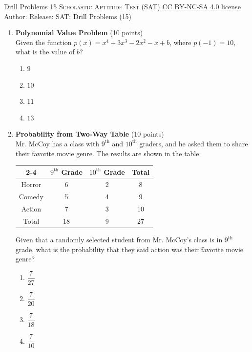 \newpage\handout
{Drill Problems 15}
{\textsc{Scholastic Aptitude Test (SAT)}}
{\href{https://creativecommons.org/licenses/by-nc-sa/4.0/}{CC BY-NC-SA 4.0 license}}
{Author: \BookAuthor}{Release: \generatedOn}
{SAT: Drill Problems (15)}



\begin{enumerate}
  \item \textbf{Polynomial Value Problem} (10 points)\\
  Given the function $p(x)=x^4+3 x^3-2 x^2-x+b$, where $p(-1)=10$, what is the value of $b$?
  \begin{enumerate}[label=(\Alph*)]
    \item $9$
    \item $10$
    \item $11$
    \item $13$
  \end{enumerate}
  \begin{subanswer}
  \end{subanswer}

  \item \textbf{Probability from Two-Way Table} (10 points)\\
  Mr. McCoy has a class with $9^{\text{th}}$ and $10^{\text{th}}$ graders, and he asked them to share their favorite movie genre. The results are shown in the table.
  \begin{center}
  \begin{tabular}{|c|c|c|c|}
  \cline{2-4} \multicolumn{1}{c|}{} & $9^{\text{th}}$ Grade & $10^{\text{th}}$ Grade & Total \\
  \hline Horror & 6 & 2 & 8 \\
  \hline Comedy & 5 & 4 & 9 \\
  \hline Action & 7 & 3 & 10 \\
  \hline Total & 18 & 9 & 27 \\
  \hline
  \end{tabular}
  \end{center}
  Given that a randomly selected student from Mr. McCoy's class is in $9^{\text{th}}$ grade, what is the probability that they said action was their favorite movie genre?
  \begin{enumerate}[label=(\Alph*)]
    \item $\dfrac{7}{27}$
    \item $\dfrac{7}{20}$
    \item $\dfrac{7}{18}$
    \item $\dfrac{7}{10}$
  \end{enumerate}
  \begin{subanswer}
  \end{subanswer}











\end{enumerate}
